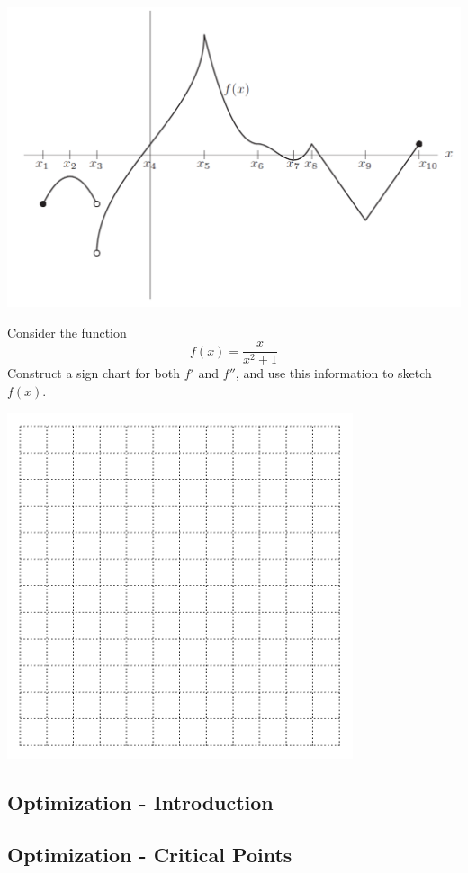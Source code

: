 \includegraphics[width=8in]{graphics/notes06_crit_pnt_oddities}

\newpage


\problem Consider the function  
$$f(x) = \frac{x}{x^2 + 1}$$
Construct a sign chart for both $f'$ and $f''$, and use this information to
sketch $f(x)$.

\vfill
\newpage
\vfill

\hfill \includegraphics[width=4in]{graphics/empty_graph_square_12}

\newpage
{}
\subsection*{Optimization - Introduction}

\newpage
{}
\subsection*{Optimization - Critical Points}






